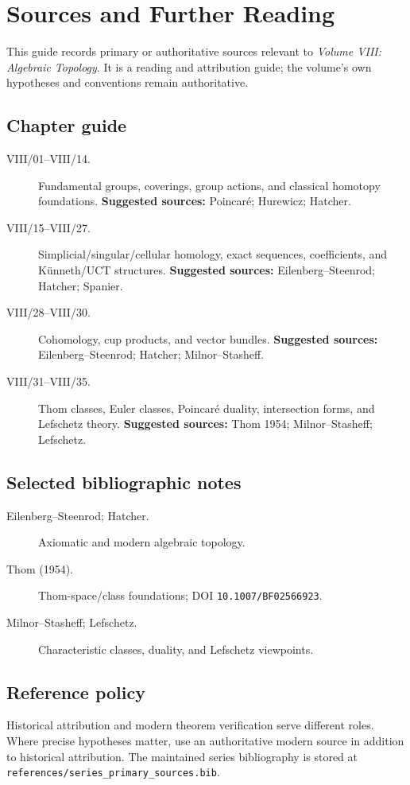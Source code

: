 \chapter*{Sources and Further Reading}
{}

This guide records primary or authoritative sources relevant to \emph{Volume VIII: Algebraic Topology}.
It is a reading and attribution guide; the volume's own hypotheses and conventions remain authoritative.

\section*{Chapter guide}
\begin{description}
\item[VIII/01--VIII/14.] Fundamental groups, coverings, group actions, and classical homotopy foundations.
\textbf{Suggested sources:} Poincaré; Hurewicz; Hatcher.

\item[VIII/15--VIII/27.] Simplicial/singular/cellular homology, exact sequences, coefficients, and Künneth/UCT structures.
\textbf{Suggested sources:} Eilenberg--Steenrod; Hatcher; Spanier.

\item[VIII/28--VIII/30.] Cohomology, cup products, and vector bundles.
\textbf{Suggested sources:} Eilenberg--Steenrod; Hatcher; Milnor--Stasheff.

\item[VIII/31--VIII/35.] Thom classes, Euler classes, Poincaré duality, intersection forms, and Lefschetz theory.
\textbf{Suggested sources:} Thom 1954; Milnor--Stasheff; Lefschetz.

\end{description}

\section*{Selected bibliographic notes}
\begin{description}
\item[Eilenberg--Steenrod; Hatcher.] Axiomatic and modern algebraic topology.

\item[Thom (1954).] Thom-space/class foundations; DOI \texttt{10.1007/BF02566923}.

\item[Milnor--Stasheff; Lefschetz.] Characteristic classes, duality, and Lefschetz viewpoints.

\end{description}

\section*{Reference policy}
Historical attribution and modern theorem verification serve different roles.
Where precise hypotheses matter, use an authoritative modern source in addition to historical attribution.
The maintained series bibliography is stored at \texttt{references/series\_primary\_sources.bib}.
